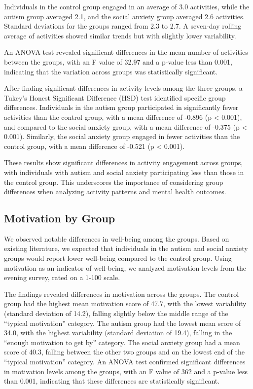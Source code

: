 \documentclass[
  letterpaper,
  number,
  review,
  3p]{elsarticle}
\begin{document}
Individuals in the control group engaged in an average of 3.0
activities, while the autism group averaged 2.1, and the social anxiety
group averaged 2.6 activities. Standard deviations for the groups ranged
from 2.3 to 2.7. A seven-day rolling average of activities showed
similar trends but with slightly lower variability.

An ANOVA test revealed significant differences in the mean number of
activities between the groups, with an F value of 32.97 and a p-value
less than 0.001, indicating that the variation across groups was
statistically significant.

After finding significant differences in activity levels among the three
groups, a Tukey's Honest Significant Difference (HSD) test identified
specific group differences. Individuals in the autism group participated
in significantly fewer activities than the control group, with a mean
difference of -0.896 (p \textless{} 0.001), and compared to the social
anxiety group, with a mean difference of -0.375 (p \textless{} 0.001).
Similarly, the social anxiety group engaged in fewer activities than the
control group, with a mean difference of -0.521 (p \textless{} 0.001).

These results show significant differences in activity engagement across
groups, with individuals with autism and social anxiety participating
less than those in the control group. This underscores the importance of
considering group differences when analyzing activity patterns and
mental health outcomes.

\subsection{Motivation by Group}\label{motivation-by-group}

We observed notable differences in well-being among the groups. Based on
existing literature, we expected that individuals in the autism and
social anxiety groups would report lower well-being compared to the
control group. Using motivation as an indicator of well-being, we
analyzed motivation levels from the evening survey, rated on a 1-100
scale.

The findings revealed differences in motivation across the groups. The
control group had the highest mean motivation score of 47.7, with the
lowest variability (standard deviation of 14.2), falling slightly below
the middle range of the ``typical motivation'' category. The autism
group had the lowest mean score of 34.0, with the highest variability
(standard deviation of 19.4), falling in the ``enough motivation to get
by'' category. The social anxiety group had a mean score of 40.3,
falling between the other two groups and on the lowest end of the
``typical motivation'' category. An ANOVA test confirmed significant
differences in motivation levels among the groups, with an F value of
362 and a p-value less than 0.001, indicating that these differences are
statistically significant.
\end{document}
